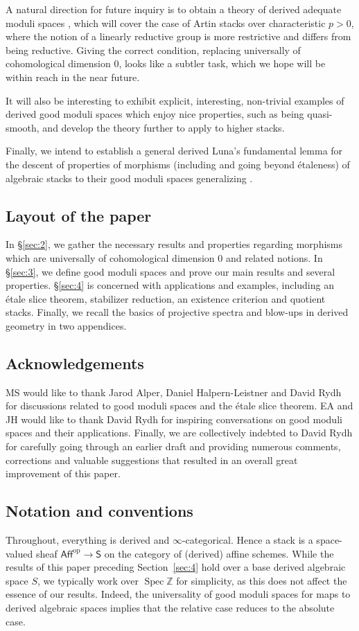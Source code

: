 \documentclass[a4paper,twoside,11pt]{amsart}
\theoremstyle{plain}
\theoremstyle{definition}
\theoremstyle{remark}
\numberwithin{equation}{section}
\newcommand{\ZZ}{\mathbb{Z}} %
\newcommand{\op}{\mathrm{op}}
\newcommand{\Space}{\mathsf{S}}
\newcommand{\Aff}{\mathsf{Aff}}
\DeclareMathOperator{\Spec}{Spec} %
\begin{document}
A natural direction for future inquiry is to obtain a theory of derived adequate moduli spaces \cite{AlperAdequate}, which will cover the case of Artin stacks over characteristic $p>0$, where the notion of a linearly reductive group is more restrictive and differs from being reductive. Giving the correct condition, replacing universally of cohomological dimension $0$, looks like a subtler task, which we hope will be within reach in the near future.

It will also be interesting to exhibit explicit, interesting, non-trivial examples of derived good moduli spaces which enjoy nice properties, such as being quasi-smooth, and develop the theory further to apply to higher stacks.

Finally, we intend to establish a general derived Luna's fundamental lemma for the descent of properties of morphisms (including and going beyond \'{e}taleness) of algebraic stacks to their good moduli spaces generalizing \cite{LunaRydh}.

\subsection*{Layout of the paper} In \S\ref{sec:2}, we gather the necessary results and properties regarding morphisms which are universally of cohomological dimension $0$ and related notions. In \S\ref{sec:3}, we define good moduli spaces and prove our main results and several properties. \S\ref{sec:4} is concerned with applications and examples, including an \'{e}tale slice theorem, stabilizer reduction, an existence criterion and quotient stacks. Finally, we recall the basics of projective spectra and blow-ups in derived geometry in two appendices.

\subsection*{Acknowledgements} MS would like to thank Jarod Alper, Daniel Halpern-Leistner and David Rydh for discussions related to good moduli spaces and the \'{e}tale slice theorem. EA and JH would like to thank David Rydh for inspiring conversations on good moduli spaces and their applications. Finally, we are collectively indebted to David Rydh for carefully going through an earlier draft and providing numerous comments, corrections and valuable suggestions that resulted in an overall great improvement of this paper.

\subsection*{Notation and conventions}
Throughout, everything is derived and $\infty$-categorical. Hence a stack is a space-valued sheaf $\Aff^\op \to \Space$ on the category of (derived) affine schemes. While the results of this paper preceding Section~\ref{sec:4} hold over a base derived algebraic space $S$, we typically work over $\Spec \ZZ$ for simplicity, as this does not affect the essence of our results. Indeed, the universality of good moduli spaces for maps to derived algebraic spaces implies that the relative case reduces to the absolute case.
\end{document}
